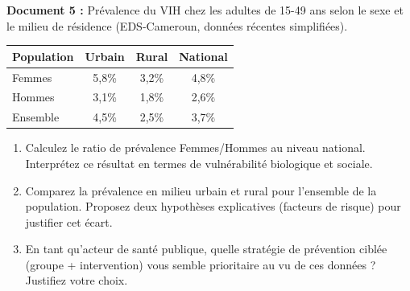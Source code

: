 \documentclass[11pt]{article}
\begin{document}
\begin{exercice}
\textbf{Document 5 :} Prévalence du VIH chez les adultes de 15-49 ans selon le sexe et le milieu de résidence (EDS-Cameroun, données récentes simplifiées).
\begin{center}
\begin{tabular}{|l|c|c|c|}
\hline
\textbf{Population} & \textbf{Urbain} & \textbf{Rural} & \textbf{National} \\
\hline
Femmes & 5,8\% & 3,2\% & 4,8\% \\
\hline
Hommes & 3,1\% & 1,8\% & 2,6\% \\
\hline
Ensemble & 4,5\% & 2,5\% & 3,7\% \\
\hline
\end{tabular}
\end{center}
\begin{enumerate}
    \item Calculez le ratio de prévalence Femmes/Hommes au niveau national. Interprétez ce résultat en termes de vulnérabilité biologique et sociale.
    \item Comparez la prévalence en milieu urbain et rural pour l'ensemble de la population. Proposez deux hypothèses explicatives (facteurs de risque) pour justifier cet écart.
    \item En tant qu'acteur de santé publique, quelle stratégie de prévention ciblée (groupe + intervention) vous semble prioritaire au vu de ces données ? Justifiez votre choix.
\end{enumerate}
\end{exercice}
\end{document}
